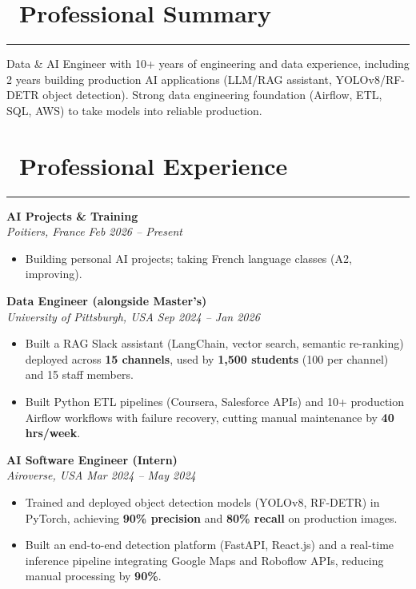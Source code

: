 \documentclass[10pt,a4paper]{article}
\newcommand{\icon}[1]{\BeginAccSupp{ActualText={}}#1\EndAccSupp{}}
\newcommand{\mainsection}[2]{%
    \section*{\color{primaryblue}\icon{#1}\ #2}
    \vspace{-0.6cm}
    \textcolor{accentblue}{\rule{14cm}{0.8pt}}
}
\newcommand{\job}[3]{%
    {\fontsize{11}{13}\selectfont\textbf{#1}}\\
    \textsl{\color{lighttext}#2} \hfill \textit{\color{lighttext}#3}
}
\begin{document}
\hspace{-1.1cm}%
\begin{minipage}[t]{14.0cm}
    \color{textgrey}
    \vspace{-1.8cm}

    \mainsection{\faUser}{Professional Summary}
    \vspace{-0.3cm}

    Data \& AI Engineer with 10+ years of engineering and data experience, including 2 years building production AI applications (LLM/RAG assistant, YOLOv8/RF-DETR object detection). Strong data engineering foundation (Airflow, ETL, SQL, AWS) to take models into reliable production.

    \vspace{-0.45cm}

    \mainsection{\faBriefcase}{Professional Experience}
    \vspace{-0.3cm}

    \job{AI Projects \& Training}{Poitiers, France}{Feb 2026 -- Present}
    \begin{itemize}[leftmargin=0.6cm, label={\color{accentblue}$\bullet$}]
        \item Building personal AI projects; taking French language classes (A2, improving).
    \end{itemize}
    \vspace{0.02cm}

    \job{Data Engineer \textmd{(alongside Master's)}}{University of Pittsburgh, USA}{Sep 2024 -- Jan 2026}
    \begin{itemize}[leftmargin=0.6cm, label={\color{accentblue}$\bullet$}]
        \item Built a RAG Slack assistant (LangChain, vector search, semantic re-ranking) deployed across \textbf{15 channels}, used by \textbf{1,500 students} (100 per channel) and 15 staff members.
        \item Built Python ETL pipelines (Coursera, Salesforce APIs) and 10+ production Airflow workflows with failure recovery, cutting manual maintenance by \textbf{40 hrs/week}.
    \end{itemize}
    \vspace{0.02cm}

    \job{AI Software Engineer \textmd{(Intern)}}{Airoverse, USA}{Mar 2024 -- May 2024}
    \begin{itemize}[leftmargin=0.6cm, label={\color{accentblue}$\bullet$}]
        \item Trained and deployed object detection models (YOLOv8, RF-DETR) in PyTorch, achieving \textbf{90\% precision} and \textbf{80\% recall} on production images.
        \item Built an end-to-end detection platform (FastAPI, React.js) and a real-time inference pipeline integrating Google Maps and Roboflow APIs, reducing manual processing by \textbf{90\%}.
    \end{itemize}
    \vspace{0.02cm}


\end{minipage}
\end{document}
